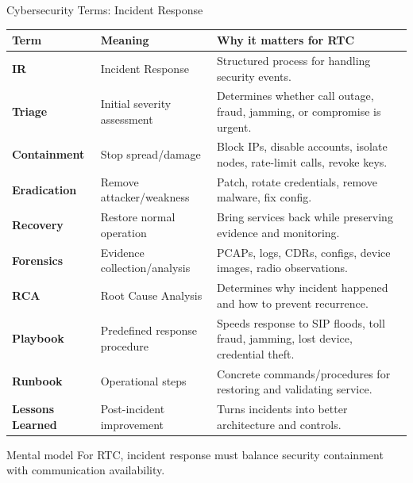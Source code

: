 \documentclass[aspectratio=169]{beamer}
\begin{document}
\begin{frame}{Cybersecurity Terms: Incident Response}
\tiny
\begin{tabular}{p{2.2cm} p{3.5cm} p{6.5cm}}
\toprule
\textbf{Term} & \textbf{Meaning} & \textbf{Why it matters for RTC} \\
\midrule
\textbf{IR} & Incident Response & Structured process for handling security events. \\
\textbf{Triage} & Initial severity assessment & Determines whether call outage, fraud, jamming, or compromise is urgent. \\
\textbf{Containment} & Stop spread/damage & Block IPs, disable accounts, isolate nodes, rate-limit calls, revoke keys. \\
\textbf{Eradication} & Remove attacker/weakness & Patch, rotate credentials, remove malware, fix config. \\
\textbf{Recovery} & Restore normal operation & Bring services back while preserving evidence and monitoring. \\
\textbf{Forensics} & Evidence collection/analysis & PCAPs, logs, CDRs, configs, device images, radio observations. \\
\textbf{RCA} & Root Cause Analysis & Determines why incident happened and how to prevent recurrence. \\
\textbf{Playbook} & Predefined response procedure & Speeds response to SIP floods, toll fraud, jamming, lost device, credential theft. \\
\textbf{Runbook} & Operational steps & Concrete commands/procedures for restoring and validating service. \\
\textbf{Lessons Learned} & Post-incident improvement & Turns incidents into better architecture and controls. \\
\bottomrule
\end{tabular}

\vspace{0.15cm}
\begin{block}{Mental model}
For RTC, incident response must balance security containment with communication availability.
\end{block}
\end{frame}
\end{document}
